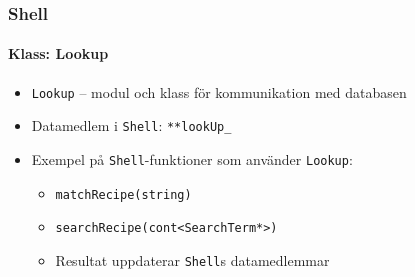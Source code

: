 \begin{frame}
  \frametitle{Shell}
  \framesubtitle{Klass: Lookup}
  \begin{itemize}
  \item \texttt{Lookup} -- modul och klass för kommunikation med databasen
  \item<2-> Datamedlem i \texttt{Shell}: \texttt{**lookUp\_}
  \item<3-> Exempel på \texttt{Shell}-funktioner som använder \texttt{Lookup}:
    \begin{itemize}
    \item \texttt{matchRecipe(string)}
    \item \texttt{searchRecipe(cont<SearchTerm*>)}
    \item Resultat uppdaterar \texttt{Shell}s datamedlemmar
    \end{itemize}
  \end{itemize}
\end{frame}

